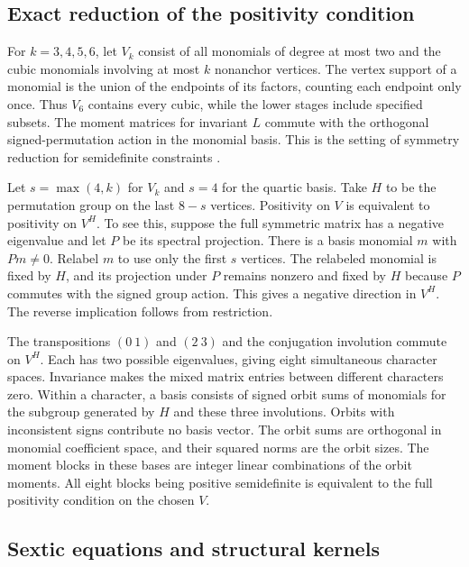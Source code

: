 \subsection{Exact reduction of the positivity condition}

For $k=3,4,5,6$, let $V_k$ consist of all monomials of degree at most two and the cubic monomials involving at most $k$ nonanchor vertices. The vertex support of a monomial is the union of the endpoints of its factors, counting each endpoint only once. Thus $V_6$ contains every cubic, while the lower stages include specified subsets. The moment matrices for invariant $L$ commute with the orthogonal signed-permutation action in the monomial basis. This is the setting of symmetry reduction for semidefinite constraints \cite{gatermannparrilo}.

Let $s=\max(4,k)$ for $V_k$ and $s=4$ for the quartic basis. Take $H$ to be the permutation group on the last $8-s$ vertices. Positivity on $V$ is equivalent to positivity on $V^H$. To see this, suppose the full symmetric matrix has a negative eigenvalue and let $P$ be its spectral projection. There is a basis monomial $m$ with $Pm\ne0$. Relabel $m$ to use only the first $s$ vertices. The relabeled monomial is fixed by $H$, and its projection under $P$ remains nonzero and fixed by $H$ because $P$ commutes with the signed group action. This gives a negative direction in $V^H$. The reverse implication follows from restriction.

The transpositions $(0\ 1)$ and $(2\ 3)$ and the conjugation involution commute on $V^H$. Each has two possible eigenvalues, giving eight simultaneous character spaces. Invariance makes the mixed matrix entries between different characters zero. Within a character, a basis consists of signed orbit sums of monomials for the subgroup generated by $H$ and these three involutions. Orbits with inconsistent signs contribute no basis vector. The orbit sums are orthogonal in monomial coefficient space, and their squared norms are the orbit sizes. The moment blocks in these bases are integer linear combinations of the orbit moments. All eight blocks being positive semidefinite is equivalent to the full positivity condition on the chosen $V$.

\subsection{Sextic equations and structural kernels}

